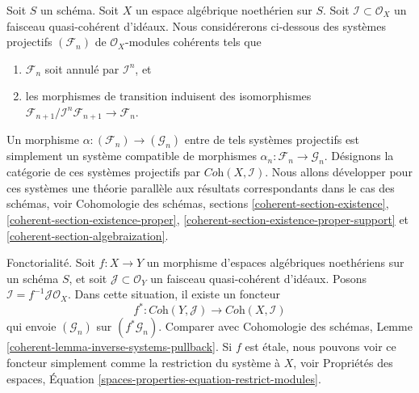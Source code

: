 \medskip\noindent
Soit $S$ un schéma. Soit $X$ un espace algébrique noethérien sur $S$.
Soit $\mathcal{I} \subset \mathcal{O}_X$ un faisceau quasi-cohérent d'idéaux.
Nous considérerons ci-dessous des systèmes projectifs $(\mathcal{F}_n)$ de
$\mathcal{O}_X$-modules cohérents tels que
\begin{enumerate}
\item $\mathcal{F}_n$ soit annulé par $\mathcal{I}^n$, et
\item les morphismes de transition induisent des isomorphismes
$\mathcal{F}_{n + 1}/\mathcal{I}^n\mathcal{F}_{n + 1} \to \mathcal{F}_n$.
\end{enumerate}
Un morphisme $\alpha : (\mathcal{F}_n) \to (\mathcal{G}_n)$
entre de tels systèmes projectifs est simplement un système compatible de morphismes
$\alpha_n : \mathcal{F}_n \to \mathcal{G}_n$.
Désignons la catégorie de ces systèmes projectifs par
$\textit{Coh}(X, \mathcal{I})$. Nous allons développer pour
ces systèmes une théorie parallèle aux
résultats correspondants dans le cas des schémas, voir
Cohomologie des schémas, sections \ref{coherent-section-existence},
\ref{coherent-section-existence-proper},
\ref{coherent-section-existence-proper-support} et
\ref{coherent-section-algebraization}.

\medskip\noindent
Fonctorialité. Soit $f : X \to Y$ un
morphisme d'espaces algébriques noethériens sur un schéma $S$, et soit
$\mathcal{J} \subset \mathcal{O}_Y$ un faisceau quasi-cohérent
d'idéaux. Posons $\mathcal{I} = f^{-1}\mathcal{J}\mathcal{O}_X$.
Dans cette situation, il existe un foncteur
$$
f^* : \textit{Coh}(Y, \mathcal{J}) \longrightarrow \textit{Coh}(X, \mathcal{I})
$$
qui envoie $(\mathcal{G}_n)$ sur $(f^*\mathcal{G}_n)$. Comparer avec
Cohomologie des schémas, Lemme \ref{coherent-lemma-inverse-systems-pullback}.
Si $f$ est étale, nous pouvons voir ce foncteur simplement comme la restriction
du système à $X$, voir Propriétés des espaces, 
Équation \ref{spaces-properties-equation-restrict-modules}.

